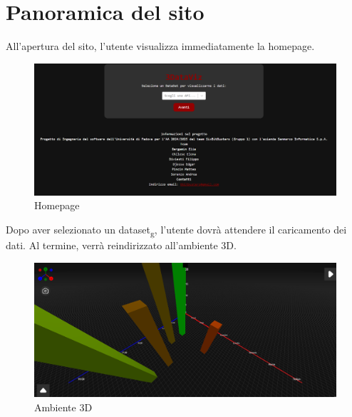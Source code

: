 \section{Panoramica del sito}
All'apertura del sito, l'utente visualizza immediatamente la homepage.
\begin{figure}[h!]
    \centering
    \includegraphics[scale=0.4]{template/images/homepage.png}
    \caption{Homepage}
\end{figure}
\newline
\newline
Dopo aver selezionato un dataset\textsubscript{g}, l'utente dovrà attendere il caricamento dei dati. Al termine, verrà reindirizzato all'ambiente 3D.
\begin{figure}[h!]
    \centering
    \includegraphics[scale=0.39]{template/images/env3D.png}
    \caption{Ambiente 3D}
\end{figure}

